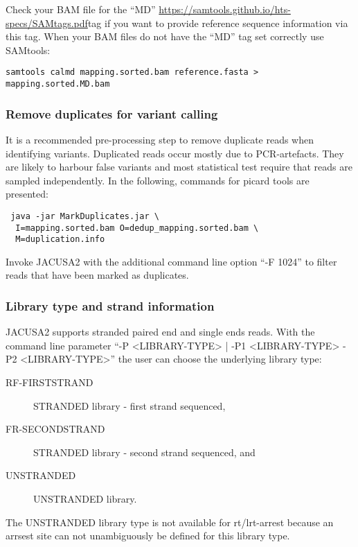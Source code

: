 \documentclass[10pt,a4paper,draft]{article}
\begin{document}
Check your BAM file for the ``MD'' \url{https://samtools.github.io/hts-specs/SAMtags.pdf}{tag} 
if you want to provide reference sequence information via this tag. 
When your BAM files do not have the ``MD'' tag set correctly use SAMtools:
\begin{verbatim}
samtools calmd mapping.sorted.bam reference.fasta > mapping.sorted.MD.bam
\end{verbatim}
\subsubsection{Remove duplicates for variant calling}
It is a recommended pre-processing step to remove duplicate reads when identifying variants.
Duplicated reads occur mostly due to PCR-artefacts. 
They are likely to harbour false variants and most statistical test require that reads are sampled independently.  
In the following, commands for picard tools are presented:
\begin{verbatim} java -jar MarkDuplicates.jar \ 
  I=mapping.sorted.bam O=dedup_mapping.sorted.bam \ 
  M=duplication.info
\end{verbatim}
Invoke JACUSA2 with the additional command line option ``-F 1024'' to filter reads that have been marked as duplicates.
\subsubsection{Library type and strand information}
JACUSA2 supports stranded paired end and single ends reads. With the command line parameter 
``-P <LIBRARY-TYPE> | -P1 <LIBRARY-TYPE> -P2 <LIBRARY-TYPE>'' the user can choose the underlying library type:
\begin{description} 
\item[RF-FIRSTSTRAND] STRANDED library - first strand sequenced,
\item[FR-SECONDSTRAND] STRANDED library - second strand sequenced, and
\item[UNSTRANDED] UNSTRANDED library.
\end{description}
The UNSTRANDED library type is not available for rt/lrt-arrest because an arrsest site can not unambiguously be  
defined for this library type.
\end{document}
